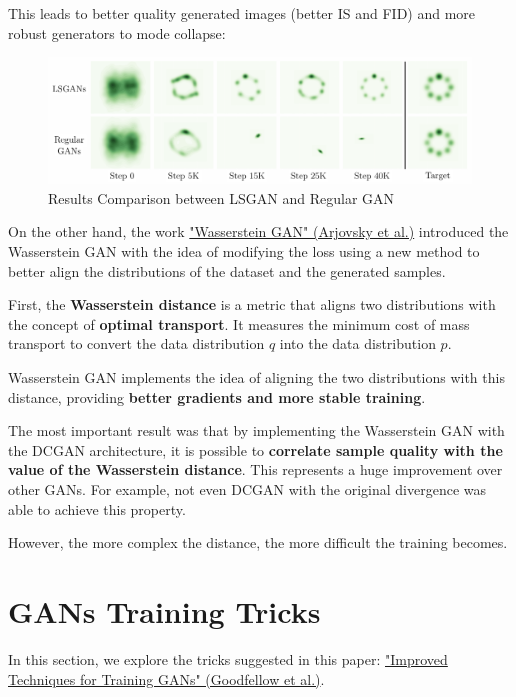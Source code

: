 This leads to better quality generated images (better IS and FID) and more robust generators to mode collapse:

\begin{figure}[!htbp]
    \centering
    \includegraphics[width=\linewidth]{tikz/chapter9 - LSGAN.pdf}
    \caption{Results Comparison between LSGAN and Regular GAN}
\end{figure}

On the other hand, the work \href{https://arxiv.org/pdf/1701.07875}{"Wasserstein GAN" (Arjovsky et al.)} introduced the Wasserstein GAN with the idea of modifying the loss using a new method to better align the distributions of the dataset and the generated samples.

First, the \textbf{Wasserstein distance} is a metric that aligns two distributions with the concept of \textbf{optimal transport}. It measures the minimum cost of mass transport to convert the data distribution $q$ into the data distribution $p$.

Wasserstein GAN implements the idea of aligning the two distributions with this distance, providing \textbf{better gradients and more stable training}.

The most important result was that by implementing the Wasserstein GAN with the DCGAN architecture, it is possible to \textbf{correlate sample quality with the value of the Wasserstein distance}. This represents a huge improvement over other GANs. For example, not even DCGAN with the original divergence was able to achieve this property.

However, the more complex the distance, the more difficult the training becomes.

\newpage
\section{GANs Training Tricks}

In this section, we explore the tricks suggested in this paper: \href{https://arxiv.org/pdf/1606.03498}{"Improved Techniques for Training GANs" (Goodfellow et al.)}.


